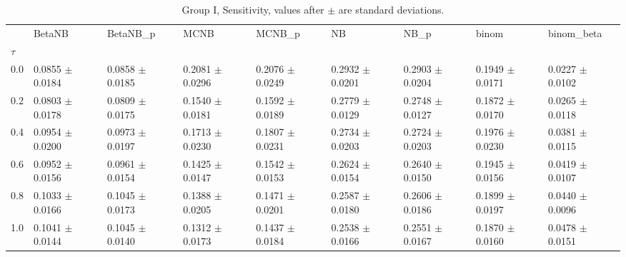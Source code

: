 \begin{table}[H]
\centering
\begin{adjustbox}{max width=\linewidth}
\begin{tabular}{lllllllll}
\toprule
 & BetaNB & BetaNB\_p & MCNB & MCNB\_p & NB & NB\_p & binom & binom\_beta \\
$\tau$ &  &  &  &  &  &  &  &  \\
\midrule
0.0 & 0.0855 $\pm$ 0.0184 & 0.0858 $\pm$ 0.0185 & 0.2081 $\pm$ 0.0296 & 0.2076 $\pm$ 0.0249 & 0.2932 $\pm$ 0.0201 & 0.2903 $\pm$ 0.0204 & 0.1949 $\pm$ 0.0171 & 0.0227 $\pm$ 0.0102 \\
0.2 & 0.0803 $\pm$ 0.0178 & 0.0809 $\pm$ 0.0175 & 0.1540 $\pm$ 0.0181 & 0.1592 $\pm$ 0.0189 & 0.2779 $\pm$ 0.0129 & 0.2748 $\pm$ 0.0127 & 0.1872 $\pm$ 0.0170 & 0.0265 $\pm$ 0.0118 \\
0.4 & 0.0954 $\pm$ 0.0200 & 0.0973 $\pm$ 0.0197 & 0.1713 $\pm$ 0.0230 & 0.1807 $\pm$ 0.0231 & 0.2734 $\pm$ 0.0203 & 0.2724 $\pm$ 0.0203 & 0.1976 $\pm$ 0.0230 & 0.0381 $\pm$ 0.0115 \\
0.6 & 0.0952 $\pm$ 0.0156 & 0.0961 $\pm$ 0.0154 & 0.1425 $\pm$ 0.0147 & 0.1542 $\pm$ 0.0153 & 0.2624 $\pm$ 0.0154 & 0.2640 $\pm$ 0.0150 & 0.1945 $\pm$ 0.0156 & 0.0419 $\pm$ 0.0107 \\
0.8 & 0.1033 $\pm$ 0.0166 & 0.1045 $\pm$ 0.0173 & 0.1388 $\pm$ 0.0205 & 0.1471 $\pm$ 0.0201 & 0.2587 $\pm$ 0.0180 & 0.2606 $\pm$ 0.0186 & 0.1899 $\pm$ 0.0197 & 0.0440 $\pm$ 0.0096 \\
1.0 & 0.1041 $\pm$ 0.0144 & 0.1045 $\pm$ 0.0140 & 0.1312 $\pm$ 0.0173 & 0.1437 $\pm$ 0.0184 & 0.2538 $\pm$ 0.0166 & 0.2551 $\pm$ 0.0167 & 0.1870 $\pm$ 0.0160 & 0.0478 $\pm$ 0.0151 \\
\bottomrule
\end{tabular}

\end{adjustbox}
\caption{Group I, Sensitivity, values after $\pm$ are standard deviations.}
\end{table}

